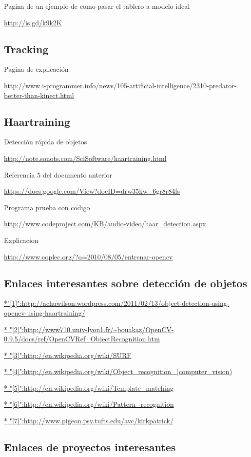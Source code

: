 \documentclass[12pt,a4paper]{report}
\begin{document}
Pagina de un ejemplo de como pasar el tablero a modelo ideal

\url{http://is.gd/k9k2K}


\subsection{ Tracking }

Pagina de explicación

\url{http://www.i-programmer.info/news/105-artificial-intelligence/2310-predator-better-than-kinect.html}

\subsection{Haartraining}

Detección rápida de objetos

\url{http://note.sonots.com/SciSoftware/haartraining.html}

Referencia 5 del documento anterior

\url{https://docs.google.com/View?docID=drw35kw_6gr8r84fs}

Programa prueba con codigo

\url{http://www.codeproject.com/KB/audio-video/haar_detection.aspx}

Explicacion

\url{http://www.coplec.org/?q=2010/08/05/entrenar-opencv}

\subsection{Enlaces interesantes sobre detección de objetos}

\url{*"[1]":http://achuwilson.wordpress.com/2011/02/13/object-detection-using-opencv-using-haartraining/}

\url{* "[2]":http://www710.univ-lyon1.fr/~bouakaz/OpenCV-0.9.5/docs/ref/OpenCVRef_ObjectRecognition.htm}

\url{* "[3]":http://en.wikipedia.org/wiki/SURF}

\url{* "[4]":http://en.wikipedia.org/wiki/Object_recognition_(computer_vision)}

\url{* "[5]":http://en.wikipedia.org/wiki/Template_matching}

\url{* "[6]":http://en.wikipedia.org/wiki/Pattern_recognition}

\url{* "[7]":http://www.pigeon.psy.tufts.edu/avc/kirkpatrick/}

\subsection{ Enlaces de proyectos interesantes}
\end{document}
